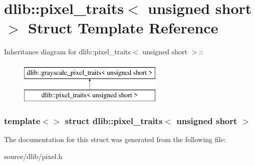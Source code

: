 \hypertarget{structdlib_1_1pixel__traits_3_01unsigned_01short_01_4}{
\section{dlib::pixel\_\-traits$<$ unsigned short $>$ Struct Template Reference}
\label{structdlib_1_1pixel__traits_3_01unsigned_01short_01_4}
}
Inheritance diagram for dlib::pixel\_\-traits$<$ unsigned short $>$::\begin{figure}[H]
\begin{center}
\leavevmode
\includegraphics[height=2cm]{structdlib_1_1pixel__traits_3_01unsigned_01short_01_4}
\end{center}
\end{figure}
\subsubsection*{template$<$$>$ struct dlib::pixel\_\-traits$<$ unsigned short $>$}



The documentation for this struct was generated from the following file:\begin{DoxyCompactItemize}
\item 
source/dlib/pixel.h\end{DoxyCompactItemize}
